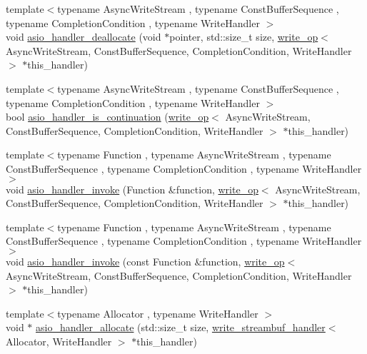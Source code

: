 \begin{DoxyCompactItemize}
\item 
{\footnotesize template$<$typename Async\+Write\+Stream , typename Const\+Buffer\+Sequence , typename Completion\+Condition , typename Write\+Handler $>$ }\\void \hyperlink{namespaceasio_1_1detail_a49118e7e4278e0d4f8c99cfb9a023888}{asio\+\_\+handler\+\_\+deallocate} (void $\ast$pointer, std\+::size\+\_\+t size, \hyperlink{classasio_1_1detail_1_1write__op}{write\+\_\+op}$<$ Async\+Write\+Stream, Const\+Buffer\+Sequence, Completion\+Condition, Write\+Handler $>$ $\ast$this\+\_\+handler)
\item 
{\footnotesize template$<$typename Async\+Write\+Stream , typename Const\+Buffer\+Sequence , typename Completion\+Condition , typename Write\+Handler $>$ }\\bool \hyperlink{namespaceasio_1_1detail_a2e3ffd08869fc8fdb860a277b083df36}{asio\+\_\+handler\+\_\+is\+\_\+continuation} (\hyperlink{classasio_1_1detail_1_1write__op}{write\+\_\+op}$<$ Async\+Write\+Stream, Const\+Buffer\+Sequence, Completion\+Condition, Write\+Handler $>$ $\ast$this\+\_\+handler)
\item 
{\footnotesize template$<$typename Function , typename Async\+Write\+Stream , typename Const\+Buffer\+Sequence , typename Completion\+Condition , typename Write\+Handler $>$ }\\void \hyperlink{namespaceasio_1_1detail_a14d974bf6d4d37313eacede139c806bc}{asio\+\_\+handler\+\_\+invoke} (Function \&function, \hyperlink{classasio_1_1detail_1_1write__op}{write\+\_\+op}$<$ Async\+Write\+Stream, Const\+Buffer\+Sequence, Completion\+Condition, Write\+Handler $>$ $\ast$this\+\_\+handler)
\item 
{\footnotesize template$<$typename Function , typename Async\+Write\+Stream , typename Const\+Buffer\+Sequence , typename Completion\+Condition , typename Write\+Handler $>$ }\\void \hyperlink{namespaceasio_1_1detail_a915d038ac1d1420539d4d03c903fba04}{asio\+\_\+handler\+\_\+invoke} (const Function \&function, \hyperlink{classasio_1_1detail_1_1write__op}{write\+\_\+op}$<$ Async\+Write\+Stream, Const\+Buffer\+Sequence, Completion\+Condition, Write\+Handler $>$ $\ast$this\+\_\+handler)
\item 
{\footnotesize template$<$typename Allocator , typename Write\+Handler $>$ }\\void $\ast$ \hyperlink{namespaceasio_1_1detail_a6120bf7fa5fa3323e532e47e19191a34}{asio\+\_\+handler\+\_\+allocate} (std\+::size\+\_\+t size, \hyperlink{classasio_1_1detail_1_1write__streambuf__handler}{write\+\_\+streambuf\+\_\+handler}$<$ Allocator, Write\+Handler $>$ $\ast$this\+\_\+handler)

\end{DoxyCompactItemize}
